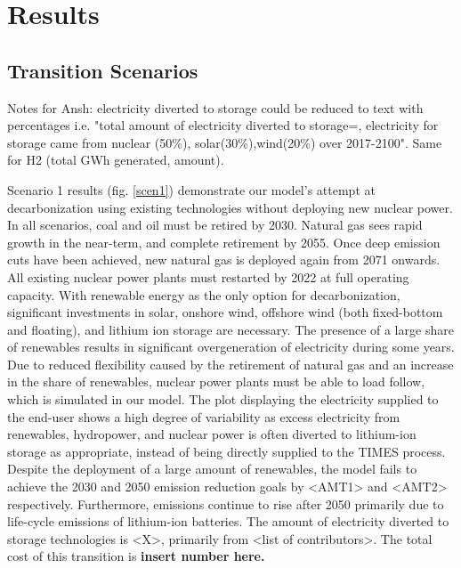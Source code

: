 \section{Results} \label{Results-and-discussion}
\subsection{Transition Scenarios}
Notes for Ansh: electricity diverted to storage could be reduced to text with percentages i.e. "total amount of electricity diverted to storage=, electricity for storage came from nuclear (50\%), solar(30\%),wind(20\%) over 2017-2100". Same for H2 (total GWh generated, amount).

Scenario 1 results (fig. \ref{scen1}) demonstrate our model's attempt at decarbonization using existing technologies without deploying new nuclear power. In all scenarios, coal and oil must be retired by 2030. Natural gas sees rapid growth in the near-term, and complete retirement by 2055. Once deep emission cuts have been achieved, new natural gas is deployed again from 2071 onwards. All existing nuclear power plants must restarted by 2022 at full operating capacity. With renewable energy as the only option for decarbonization, significant investments in solar, onshore wind, offshore wind (both fixed-bottom and floating), and lithium ion storage are necessary. The presence of a large share of renewables results in significant overgeneration of electricity during some years. Due to reduced flexibility caused by the retirement of natural gas and an increase in the share of renewables, nuclear power plants must be able to load follow, which is simulated in our model. The plot displaying the electricity supplied to the end-user shows a high degree of variability as excess electricity from renewables, hydropower, and nuclear power is often diverted to lithium-ion storage as appropriate, instead of being directly supplied to the \gls{TIMES} process. Despite the deployment of a large amount of renewables, the model fails to achieve the 2030 and 2050 emission reduction goals by <AMT1> and <AMT2> respectively. Furthermore, emissions continue to rise after 2050 primarily due to life-cycle emissions of lithium-ion batteries. The amount of electricity diverted to storage technologies is <X>, primarily from <list of contributors>. The total cost of this transition is \textbf{insert number here.}



